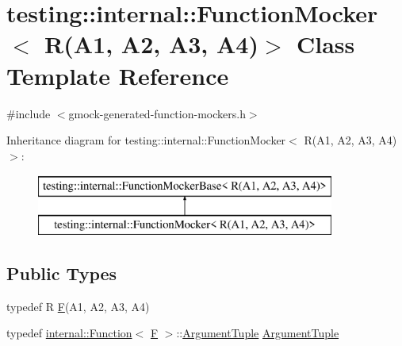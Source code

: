 \hypertarget{classtesting_1_1internal_1_1_function_mocker_3_01_r_07_a1_00_01_a2_00_01_a3_00_01_a4_08_4}{}\section{testing\+::internal\+::Function\+Mocker$<$ R(A1, A2, A3, A4)$>$ Class Template Reference}
\label{classtesting_1_1internal_1_1_function_mocker_3_01_r_07_a1_00_01_a2_00_01_a3_00_01_a4_08_4}


{\ttfamily \#include $<$gmock-\/generated-\/function-\/mockers.\+h$>$}

Inheritance diagram for testing\+::internal\+::Function\+Mocker$<$ R(A1, A2, A3, A4)$>$\+:\begin{figure}[H]
\begin{center}
\leavevmode
\includegraphics[height=2.000000cm]{dd/d17/classtesting_1_1internal_1_1_function_mocker_3_01_r_07_a1_00_01_a2_00_01_a3_00_01_a4_08_4}
\end{center}
\end{figure}
\subsection*{Public Types}
\begin{DoxyCompactItemize}
\item 
typedef R \mbox{\hyperlink{classtesting_1_1internal_1_1_function_mocker_3_01_r_07_a1_00_01_a2_00_01_a3_00_01_a4_08_4_a9be04bb962edb1458c857ca8e9db9318}{F}}(A1, A2, A3, A4)
\item 
typedef \mbox{\hyperlink{structtesting_1_1internal_1_1_function}{internal\+::\+Function}}$<$ \mbox{\hyperlink{classtesting_1_1internal_1_1_function_mocker_3_01_r_07_a1_00_01_a2_00_01_a3_00_01_a4_08_4_a9be04bb962edb1458c857ca8e9db9318}{F}} $>$\+::\mbox{\hyperlink{classtesting_1_1internal_1_1_function_mocker_3_01_r_07_a1_00_01_a2_00_01_a3_00_01_a4_08_4_a97576d71dfe85cbb0fc51fcaad6d4cc1}{Argument\+Tuple}} \mbox{\hyperlink{classtesting_1_1internal_1_1_function_mocker_3_01_r_07_a1_00_01_a2_00_01_a3_00_01_a4_08_4_a97576d71dfe85cbb0fc51fcaad6d4cc1}{Argument\+Tuple}}
\end{DoxyCompactItemize}
